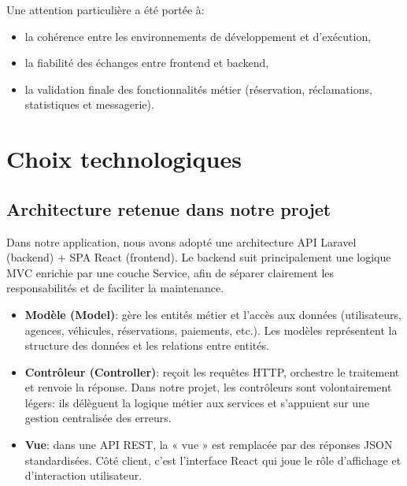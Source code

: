 Une attention particulière a été portée à:
\begin{itemize}
	\item la cohérence entre les environnements de développement et d'exécution,
	\item la fiabilité des échanges entre frontend et backend,
	\item la validation finale des fonctionnalités métier (réservation, réclamations,
	statistiques et messagerie).
\end{itemize}




	\section{Choix technologiques}
	\label{sec:choix-technologiques}

	\subsection{Architecture retenue dans notre projet}
	Dans notre application, nous avons adopté une architecture API Laravel (backend)
	+ SPA React (frontend). Le backend suit principalement une logique MVC enrichie
	par une couche Service, afin de séparer clairement les responsabilités et de
	faciliter la maintenance. \cite{Code-Magazine}


	\begin{itemize}
		\item \textbf{Modèle (Model)}: gère les entités métier et l'accès aux données
		(utilisateurs, agences, véhicules, réservations, paiements, etc.). Les modèles
		représentent la structure des données et les relations entre entités.

		\item \textbf{Contrôleur (Controller)}: reçoit les requêtes HTTP, orchestre le
		traitement et renvoie la réponse. Dans notre projet, les contrôleurs sont
		volontairement légers: ils délèguent la logique métier aux services et
		s'appuient sur une gestion centralisée des erreurs.

		\item \textbf{Vue}: dans une API REST, la « vue » est remplacée par des réponses
		JSON standardisées. Côté client, c'est l'interface React qui joue le rôle
		d'affichage et d'interaction utilisateur.
	\end{itemize}
	
